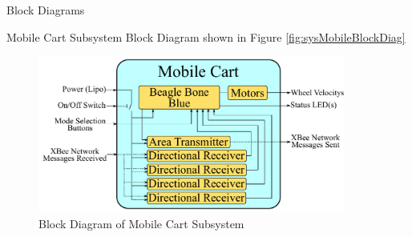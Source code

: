 \documentclass{beamer}
\begin{document}

\begin{frame}{Block Diagrams}
  \begin{block}{}
    Mobile Cart Subsystem Block Diagram shown in Figure \autoref{fig:sysMobileBlockDiag}
  \end{block}
  \begin{figure}[b]
    \centering
    \includegraphics[width=0.9\textwidth]{figs/mobile_cart_block_diagram}
    \caption{Block Diagram of Mobile Cart Subsystem}
    \label{fig:sysMobileBlockDiag}
  \end{figure}
\end{frame}

\end{document}
